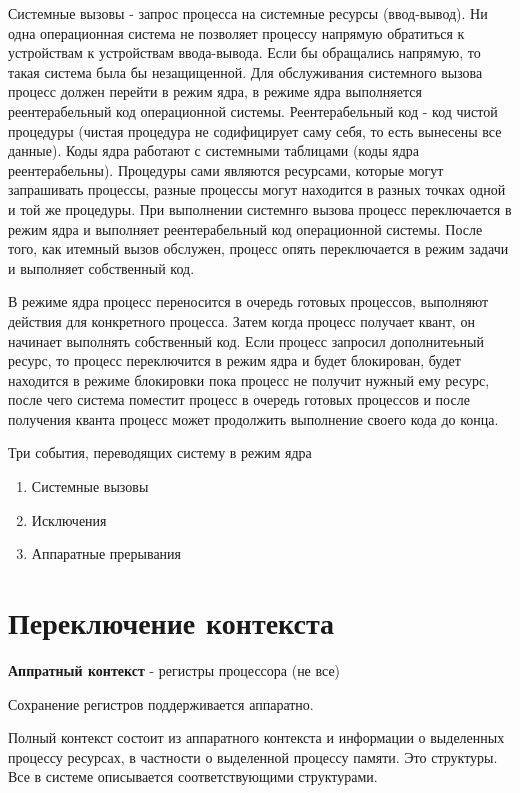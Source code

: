 \documentclass[a4paper, 14pt]{report}
\begin{document}
Системные вызовы - запрос процесса на системные ресурсы (ввод-вывод). Ни одна операционная система не позволяет процессу напрямую обратиться к устройствам к устройствам ввода-вывода. Если бы обращались напрямую, то такая система была бы незащищенной. Для обслуживания системного вызова процесс должен перейти в режим ядра, в режиме ядра выполняется реентерабельный код операционной системы. Реентерабельный код - код чистой процедуры (чистая процедура не содифицирует саму себя, то есть вынесены все данные). Коды ядра работают с системными таблицами (коды ядра реентерабельны). Процедуры сами являются ресурсами, которые могут запрашивать процессы, разные процессы могут находится в разных точках одной и той же процедуры. При выполнении системнго вызова процесс переключается в режим ядра и выполняет реентерабельный код операционной системы. После того, как итемный вызов обслужен, процесс опять переключается в режим задачи и выполняет собственный код.

В режиме ядра процесс переносится в очередь готовых процессов, выполняют действия для конкретного процесса. Затем когда процесс получает квант, он начинает выполнять собственный код. Если процесс запросил дополнитеьный ресурс, то процесс переключится в режим ядра и будет блокирован, будет находится в режиме блокировки пока процесс не получит нужный ему ресурс, после чего система поместит процесс в очередь готовых процессов и после получения кванта процесс может продолжить выполнение своего кода до конца.

Три события, переводящих систему в режим ядра

\begin{enumerate}
    \item Системные вызовы
    \item Исключения
    \item Аппаратные прерывания
\end{enumerate}

\section{Переключение контекста}

\textbf{Аппратный контекст} - регистры процессора (не все)

Сохранение регистров поддерживается аппаратно.

Полный контекст состоит из аппаратного контекста и информации о выделенных процессу ресурсах, в частности о выделенной процессу памяти. Это структуры. Все в системе описывается соответствующими структурами.
\end{document}
